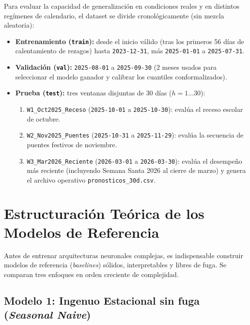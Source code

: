 \documentclass[11pt,a4paper]{article}
\begin{document}
Para evaluar la capacidad de generalización en condiciones reales y en distintos regímenes de calendario, el dataset se divide cronológicamente (sin mezcla aleatoria):
\begin{itemize}[leftmargin=1.5em]
    \item \textbf{Entrenamiento (\texttt{train}):} desde el inicio válido (tras los primeros 56 días de calentamiento de rezagos) hasta \texttt{2023-12-31}, más \texttt{2025-01-01} a \texttt{2025-07-31}.
    \item \textbf{Validación (\texttt{val}):} \texttt{2025-08-01} a \texttt{2025-09-30} (2 meses usados para seleccionar el modelo ganador y calibrar los cuantiles conformalizados).
    \item \textbf{Prueba (\texttt{test}):} tres ventanas disjuntas de 30 días ($h = 1 \dots 30$):
    \begin{enumerate}
        \item \texttt{W1\_Oct2025\_Receso} (\texttt{2025-10-01} a \texttt{2025-10-30}): evalúa el receso escolar de octubre.
        \item \texttt{W2\_Nov2025\_Puentes} (\texttt{2025-10-31} a \texttt{2025-11-29}): evalúa la secuencia de puentes festivos de noviembre.
        \item \texttt{W3\_Mar2026\_Reciente} (\texttt{2026-03-01} a \texttt{2026-03-30}): evalúa el desempeño más reciente (incluyendo Semana Santa 2026 al cierre de marzo) y genera el archivo operativo \texttt{pronosticos\_30d.csv}.
    \end{enumerate}
\end{itemize}

\section{Estructuración Teórica de los Modelos de Referencia}

Antes de entrenar arquitecturas neuronales complejas, es indispensable construir modelos de referencia (\textit{baselines}) sólidos, interpretables y libres de fuga. Se comparan tres enfoques en orden creciente de complejidad.

\subsection{Modelo 1: Ingenuo Estacional sin fuga (\textit{Seasonal Naive})}
\end{document}
